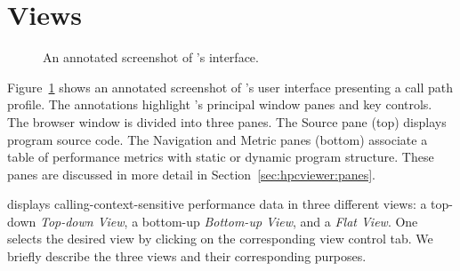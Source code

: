 
\section{Views}

\begin{figure}[t]
\caption{An annotated screenshot of \hpcviewer{}'s interface.}
\label{fig:hpcviewer-legend}
\end{figure}

Figure~\ref{fig:hpcviewer-legend} shows an annotated screenshot of \hpcviewer{}'s user interface presenting a call path profile.
The annotations highlight \hpcviewer{}'s principal window panes and key controls.
The browser window is divided into three panes.
The Source pane (top) displays program source code.
The Navigation and Metric panes (bottom) associate a table of performance metrics with static or dynamic program structure.
These panes are discussed in more detail in Section~\ref{sec:hpcviewer:panes}.

\hpcviewer{} displays calling-context-sensitive performance data in three different views: a top-down \emph{Top-down View}, a bottom-up \emph{Bottom-up View}, and a \emph{Flat View}.
One selects the desired view by clicking on the corresponding view control tab.
We briefly describe the three views and their corresponding purposes.

